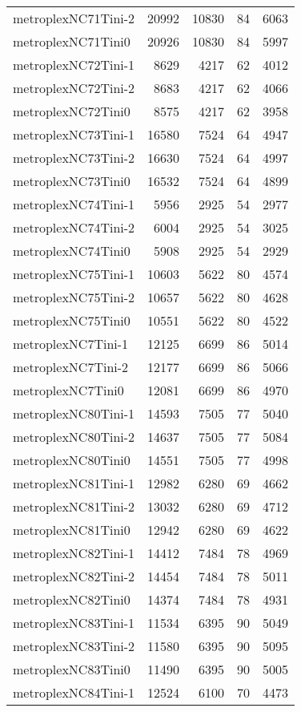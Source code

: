 \documentclass[../../../thesis.tex]{subfiles}
\begin{document}
\begin{longtable}{lrrrr}
metroplexNC71Tini-2 & 20992 & 10830 & 84 & 6063 \\
metroplexNC71Tini0 & 20926 & 10830 & 84 & 5997 \\
metroplexNC72Tini-1 & 8629 & 4217 & 62 & 4012 \\
metroplexNC72Tini-2 & 8683 & 4217 & 62 & 4066 \\
metroplexNC72Tini0 & 8575 & 4217 & 62 & 3958 \\
metroplexNC73Tini-1 & 16580 & 7524 & 64 & 4947 \\
metroplexNC73Tini-2 & 16630 & 7524 & 64 & 4997 \\
metroplexNC73Tini0 & 16532 & 7524 & 64 & 4899 \\
metroplexNC74Tini-1 & 5956 & 2925 & 54 & 2977 \\
metroplexNC74Tini-2 & 6004 & 2925 & 54 & 3025 \\
metroplexNC74Tini0 & 5908 & 2925 & 54 & 2929 \\
metroplexNC75Tini-1 & 10603 & 5622 & 80 & 4574 \\
metroplexNC75Tini-2 & 10657 & 5622 & 80 & 4628 \\
metroplexNC75Tini0 & 10551 & 5622 & 80 & 4522 \\
metroplexNC7Tini-1 & 12125 & 6699 & 86 & 5014 \\
metroplexNC7Tini-2 & 12177 & 6699 & 86 & 5066 \\
metroplexNC7Tini0 & 12081 & 6699 & 86 & 4970 \\
metroplexNC80Tini-1 & 14593 & 7505 & 77 & 5040 \\
metroplexNC80Tini-2 & 14637 & 7505 & 77 & 5084 \\
metroplexNC80Tini0 & 14551 & 7505 & 77 & 4998 \\
metroplexNC81Tini-1 & 12982 & 6280 & 69 & 4662 \\
metroplexNC81Tini-2 & 13032 & 6280 & 69 & 4712 \\
metroplexNC81Tini0 & 12942 & 6280 & 69 & 4622 \\
metroplexNC82Tini-1 & 14412 & 7484 & 78 & 4969 \\
metroplexNC82Tini-2 & 14454 & 7484 & 78 & 5011 \\
metroplexNC82Tini0 & 14374 & 7484 & 78 & 4931 \\
metroplexNC83Tini-1 & 11534 & 6395 & 90 & 5049 \\
metroplexNC83Tini-2 & 11580 & 6395 & 90 & 5095 \\
metroplexNC83Tini0 & 11490 & 6395 & 90 & 5005 \\
metroplexNC84Tini-1 & 12524 & 6100 & 70 & 4473 \\

\end{longtable}
\end{document}
